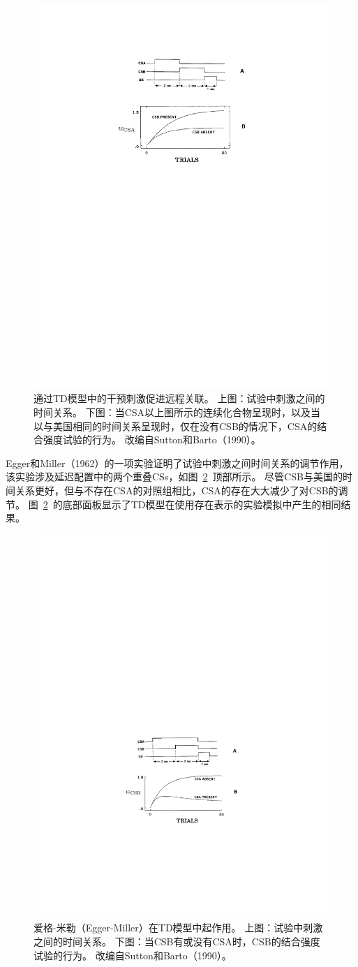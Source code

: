 {\begin{figure}[!htb]
	\centering
	\includegraphics[width=0.5\linewidth]{chap11/fig_11_2}
	\caption{通过TD模型中的干预刺激促进远程关联。
		上图：试验中刺激之间的时间关系。
		下图：当CSA以上图所示的连续化合物呈现时，以及当以与美国相同的时间关系呈现时，仅在没有CSB的情况下，CSA的结合强度试验的行为。
		改编自Sutton和Barto（1990）。  \label{fig:11_2}}
\end{figure}


Egger和Miller（1962）的一项实验证明了试验中刺激之间时间关系的调节作用，该实验涉及延迟配置中的两个重叠CSs，如图~\ref{fig:11_3}~顶部所示。
尽管CSB与美国的时间关系更好，但与不存在CSA的对照组相比，CSA的存在大大减少了对CSB的调节。
图~\ref{fig:11_3}~的底部面板显示了TD模型在使用存在表示的实验模拟中产生的相同结果。

\begin{figure}[!htb]
	\centering
	\includegraphics[width=0.5\linewidth]{chap11/fig_11_3}
	\caption{爱格-米勒（Egger-Miller）在TD模型中起作用。
		上图：试验中刺激之间的时间关系。
		下图：当CSB有或没有CSA时，CSB的结合强度试验的行为。
		改编自Sutton和Barto（1990）。  \label{fig:11_3}}
\end{figure}
	
}
